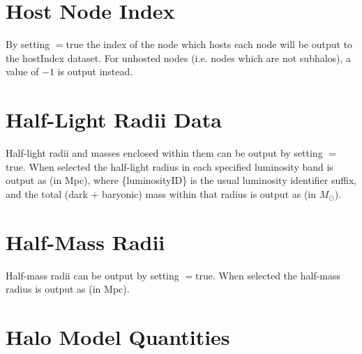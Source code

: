 \section{Host Node Index}

By setting {\normalfont \ttfamily [outputHostIndices]}$=${\normalfont \ttfamily true} the index of the node which hosts each node will be output to the {\normalfont \ttfamily hostIndex} dataset. For unhosted nodes (i.e. nodes which are not subhalos), a value of $-1$ is output instead.

\section{Half-Light Radii Data}

Half-light radii and masses enclosed within them can be output by setting {\normalfont \ttfamily [outputHalfLightData]}$=${\normalfont \ttfamily true}. When selected the half-light radius in each specified luminosity band is output as {\normalfont {}} (in Mpc), where {\normalfont \ttfamily\{luminosityID\}} is the usual luminosity identifier suffix, and the total (dark + baryonic) mass within that radius is output as {\normalfont {}} (in $M_\odot$).

\section{Half-Mass Radii}

Half-mass radii can be output by setting {\normalfont \ttfamily [outputHalfMassData]}$=${\normalfont \ttfamily true}. When selected the half-mass radius is output as {\normalfont \ttfamily [halfMassRadius]} (in Mpc).

\section{Halo Model Quantities}\label{sec:HaloModelOutput}

